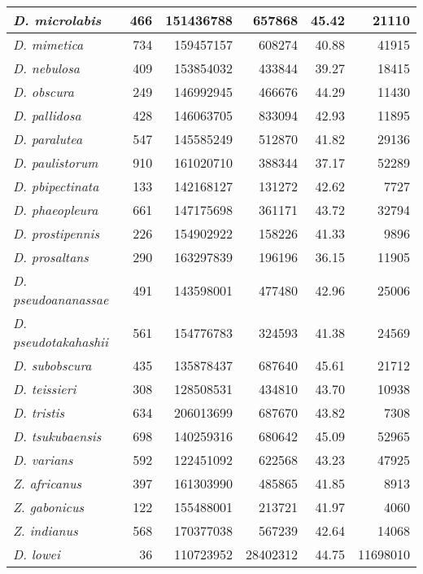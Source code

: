 \begin{table}
\begin{tabular}[t]{l|r|r|r|r|r}
\hline
\textit{D. microlabis} & 466 & 151436788 & 657868 & 45.42 & 21110\\
\hline
\textit{D. mimetica} & 734 & 159457157 & 608274 & 40.88 & 41915\\
\hline
\textit{D. nebulosa} & 409 & 153854032 & 433844 & 39.27 & 18415\\
\hline
\textit{D. obscura} & 249 & 146992945 & 466676 & 44.29 & 11430\\
\hline
\textit{D. pallidosa} & 428 & 146063705 & 833094 & 42.93 & 11895\\
\hline
\textit{D. paralutea} & 547 & 145585249 & 512870 & 41.82 & 29136\\
\hline
\textit{D. paulistorum} & 910 & 161020710 & 388344 & 37.17 & 52289\\
\hline
\textit{D. pbipectinata} & 133 & 142168127 & 131272 & 42.62 & 7727\\
\hline
\textit{D. phaeopleura} & 661 & 147175698 & 361171 & 43.72 & 32794\\
\hline
\textit{D. prostipennis} & 226 & 154902922 & 158226 & 41.33 & 9896\\
\hline
\textit{D. prosaltans} & 290 & 163297839 & 196196 & 36.15 & 11905\\
\hline
\textit{D. pseudoananassae} & 491 & 143598001 & 477480 & 42.96 & 25006\\
\hline
\textit{D. pseudotakahashii} & 561 & 154776783 & 324593 & 41.38 & 24569\\
\hline
\textit{D. subobscura} & 435 & 135878437 & 687640 & 45.61 & 21712\\
\hline
\textit{D. teissieri} & 308 & 128508531 & 434810 & 43.70 & 10938\\
\hline
\textit{D. tristis} & 634 & 206013699 & 687670 & 43.82 & 7308\\
\hline
\textit{D. tsukubaensis} & 698 & 140259316 & 680642 & 45.09 & 52965\\
\hline
\textit{D. varians} & 592 & 122451092 & 622568 & 43.23 & 47925\\
\hline
\textit{Z. africanus} & 397 & 161303990 & 485865 & 41.85 & 8913\\
\hline
\textit{Z. gabonicus} & 122 & 155488001 & 213721 & 41.97 & 4060\\
\hline
\textit{Z. indianus} & 568 & 170377038 & 567239 & 42.64 & 14068\\
\hline
\textit{D. lowei} & 36 & 110723952 & 28402312 & 44.75 & 11698010\\
\hline
\end{tabular}
\end{table}